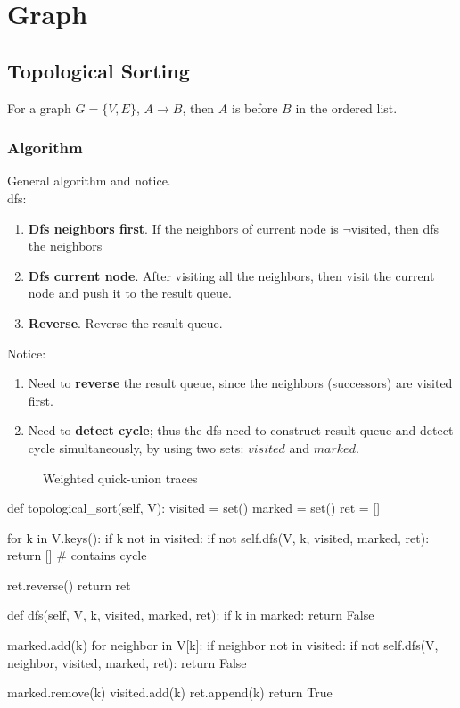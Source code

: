 \chapter{Graph}


\section{Topological Sorting}
For a graph $G=\{V, E\}$, $ A \rightarrow B $, then $A$ is before $B$ in the ordered list. 
\subsection{Algorithm}
General algorithm and notice.\\
 
dfs:
\begin{enumerate}
\item \textbf{Dfs neighbors first}. If the neighbors of current node is  $\neg$visited, then dfs the neighbors
\item \textbf{Dfs current node}. After visiting all the neighbors, then visit the current node and push it to the result queue.
\item \textbf{Reverse}. Reverse the result queue. 
\end{enumerate}

Notice:
\begin{enumerate}
\item Need to \textbf{reverse} the result queue, since the neighbors (successors) are visited first. 
\item Need to \textbf{detect cycle}; thus the dfs need to construct result queue and detect cycle simultaneously, by using two sets: $visited$ and $marked$. 
\end{enumerate}
\begin{figure}[hbtp]
\centering
\subfloat{\texttt{[image: uf]}}
\caption{Weighted quick-union traces}
\label{fig:union_find}
\end{figure}
\begin{python}
def topological_sort(self, V):
    visited = set()
    marked = set()
    ret = []

    for k in V.keys():
        if k not in visited:
            if not self.dfs(V, k, visited, marked, ret):
                return []  # contains cycle 

    ret.reverse()
    return ret

def dfs(self, V, k, visited, marked, ret):
    if k in marked:
        return False

    marked.add(k)
    for neighbor in V[k]:
        if neighbor not in visited:
            if not self.dfs(V, neighbor, visited, marked, ret):
                return False

    marked.remove(k)
    visited.add(k)
    ret.append(k)
    return True
\end{python}

